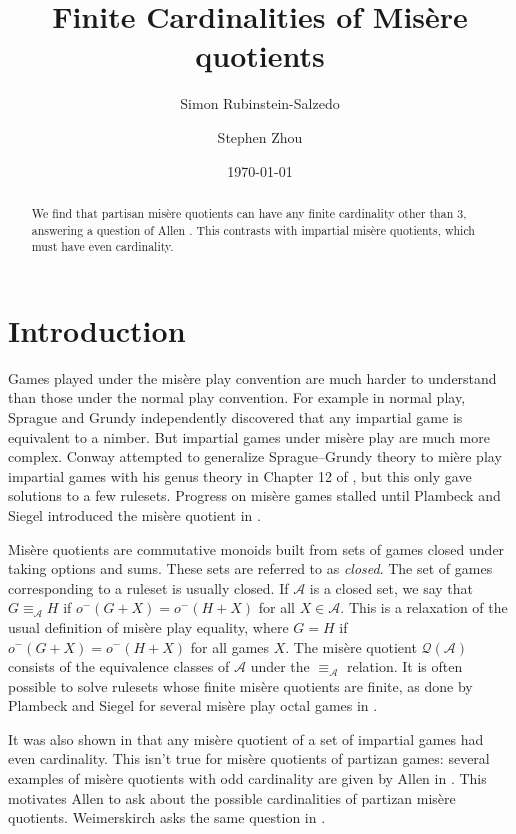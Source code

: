 \documentclass{amsart}
\title{Finite Cardinalities of Mis\`ere quotients}
\author{Simon Rubinstein-Salzedo}
\author{Stephen Zhou}
\date{\today}
\theoremstyle{plain}
\theoremstyle{definition}
\theoremstyle{remark}
\numberwithin{equation}{section}
\numberwithin{thm}{section}
\begin{document}
\begin{abstract}
    We find that partisan mis\`ere quotients can have any finite cardinality other than $3$, answering a question of Allen \cite{allen2015peeking}. This contrasts with impartial mis\`ere quotients, which must have even cardinality.
\end{abstract}
\maketitle


\section{Introduction}
Games played under the mis\`ere play convention are much harder to understand than those under the normal play convention. For example in normal play, Sprague \cite{sprague} and Grundy \cite{grundy} independently discovered that any impartial game is equivalent to a nimber.
But impartial games under mis\`ere play are much more complex. Conway attempted to generalize Sprague--Grundy theory to mi\`ere play impartial games with his genus theory in Chapter 12 of \cite{conway2000numbers}, but this only gave solutions to a few rulesets. Progress on mis\`ere games stalled until Plambeck and Siegel introduced the mis\`ere quotient in \cite{plambeck2008misere}. 

Mis\`ere quotients are commutative monoids built from sets of games closed under taking options and sums. These sets are referred to as \emph{closed}. The set of games corresponding to a ruleset is usually closed. If $\mathscr{A}$ is a closed set, we say that $G \equiv_{\mathscr{A}} H$ if $o^-(G+X) =o^- (H+X)$ for all $X \in \mathscr{A}$. This is a relaxation of the usual definition of mis\`ere play equality, where $G = H$ if $o^- (G+X) = o^- (H+X)$ for all games $X $.
The mis\`ere quotient $\mathcal{Q}(\mathscr{A})$ consists of the equivalence classes of $\mathscr{A}$ under the $\equiv_{\mathscr{A}}$ relation.
It is often possible to solve rulesets whose finite mis\`ere quotients are finite, as done by Plambeck and Siegel for several mis\`ere play octal games in \cite{plambeck2008misere}. 

It was also shown in \cite{plambeck2008misere} that any mis\`ere quotient of a set of impartial games had even cardinality. This isn't true for mis\`ere quotients of partizan games: several examples of mis\`ere quotients with odd cardinality are given by Allen in \cite{allen2015peeking}. This motivates Allen to ask about the possible cardinalities of partizan mis\`ere quotients. Weimerskirch asks the same question in \cite{weimerskirchquotients}. 
\end{document}
